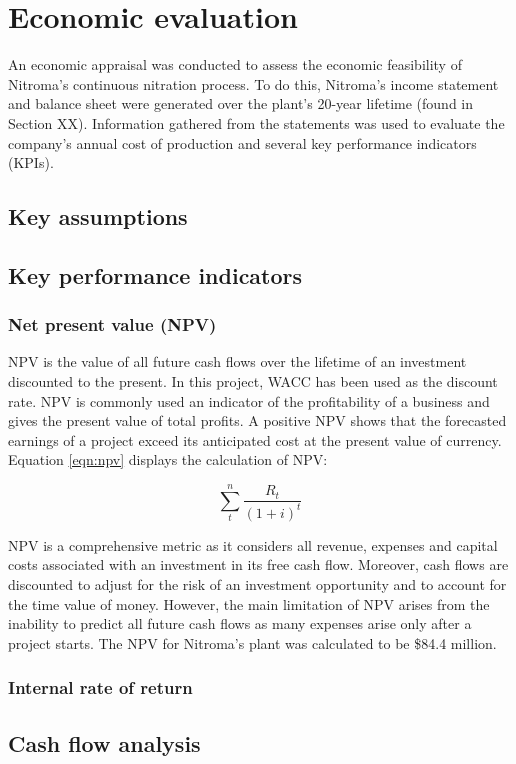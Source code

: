 \section{Economic evaluation}
An economic appraisal was conducted to assess the economic feasibility of Nitroma’s continuous nitration process. To do this, Nitroma’s income statement and balance sheet were generated over the plant’s 20-year lifetime (found in Section XX). Information gathered from the statements was used to evaluate the company’s annual cost of production and several key performance indicators (KPIs).

\subsection{Key assumptions}

\subsection{Key performance indicators}

\subsubsection{Net present value (NPV)}
NPV is the value of all future cash flows over the lifetime of an investment discounted to the present. In this project, WACC has been used as the discount rate. NPV is commonly used an indicator of the profitability of a business and gives the present value of total profits. A positive NPV shows that the forecasted earnings of a project exceed its anticipated cost at the present value of currency. Equation \ref{eqn:npv} displays the calculation of NPV:

\begin{equation}
\label{eqn:npv}
    \sum_t^n\frac{R_{t}}{(1+i)^{t}}
\end{equation}

NPV is a comprehensive metric as it considers all revenue, expenses and capital costs associated with an investment in its free cash flow. Moreover, cash flows are discounted to adjust for the risk of an investment opportunity and to account for the time value of money. However, the main limitation of NPV arises from the inability to predict all future cash flows as many expenses arise only after a project starts. The NPV for Nitroma’s plant was calculated to be \$84.4 million.

\subsubsection{Internal rate of return}

\subsection{Cash flow analysis}
